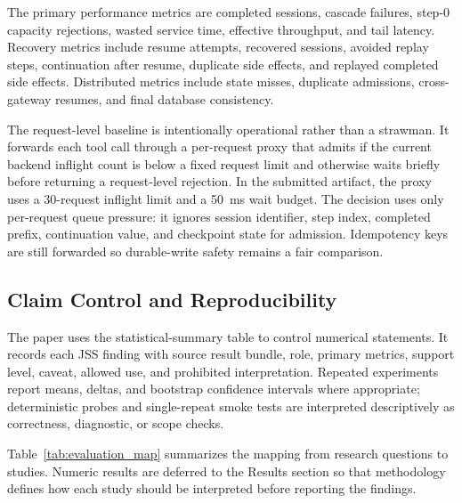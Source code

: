 \documentclass[5p,times]{elsarticle}
\begin{document}
The primary performance metrics are completed sessions, cascade failures, step-0 capacity rejections, wasted service time, effective throughput, and tail latency. Recovery metrics include resume attempts, recovered sessions, avoided replay steps, continuation after resume, duplicate side effects, and replayed completed side effects. Distributed metrics include state misses, duplicate admissions, cross-gateway resumes, and final database consistency.

The request-level baseline is intentionally operational rather than a strawman. It forwards each tool call through a per-request proxy that admits if the current backend inflight count is below a fixed request limit and otherwise waits briefly before returning a request-level rejection. In the submitted artifact, the proxy uses a 30-request inflight limit and a 50~ms wait budget. The decision uses only per-request queue pressure: it ignores session identifier, step index, completed prefix, continuation value, and checkpoint state for admission. Idempotency keys are still forwarded so durable-write safety remains a fair comparison.

\subsection{Claim Control and Reproducibility}

The paper uses the statistical-summary table to control numerical statements. It records each JSS finding with source result bundle, role, primary metrics, support level, caveat, allowed use, and prohibited interpretation. Repeated experiments report means, deltas, and bootstrap confidence intervals where appropriate; deterministic probes and single-repeat smoke tests are interpreted descriptively as correctness, diagnostic, or scope checks.

Table~\ref{tab:evaluation_map} summarizes the mapping from research questions to studies. Numeric results are deferred to the Results section so that methodology defines how each study should be interpreted before reporting the findings.
\end{document}
